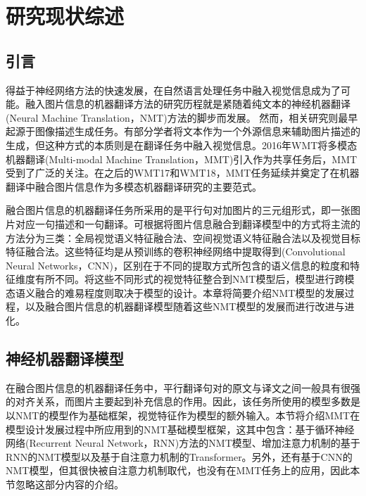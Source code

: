 \chapter{研究现状综述}\label{chap:relatedwork}

\section{引言}
得益于神经网络方法的快速发展，在自然语言处理任务中融入视觉信息成为了可能。融入图片信息的机器翻译方法的研究历程就是紧随着纯文本的神经机器翻译(Neural Machine Translation，NMT)方法的脚步而发展。
然而，相关研究则最早起源于图像描述生成任务。有部分学者将文本作为一个外源信息来辅助图片描述的生成，但这种方式的本质则是在翻译任务中融入视觉信息。2016年WMT将多模态机器翻译(Multi-modal Machine Translation，MMT)引入作为共享任务后，MMT受到了广泛的关注。在之后的WMT17和WMT18，MMT任务延续并奠定了在机器翻译中融合图片信息作为多模态机器翻译研究的主要范式。

融合图片信息的机器翻译任务所采用的是平行句对加图片的三元组形式，即一张图片对应一句描述和一句翻译。可根据将图片信息融合到翻译模型中的方式将主流的方法分为三类：全局视觉语义特征融合法、空间视觉语义特征融合法以及视觉目标特征融合法。这些特征均是从预训练的卷积神经网络中提取得到(Convolutional Neural Networks，CNN)，区别在于不同的提取方式所包含的语义信息的粒度和特征维度有所不同。将这些不同形式的视觉特征整合到NMT模型后，模型进行跨模态语义融合的难易程度则取决于模型的设计。本章将简要介绍NMT模型的发展过程，以及融合图片信息的机器翻译模型随着这些NMT模型的发展而进行改进与进化。

\section{神经机器翻译模型}
在融合图片信息的机器翻译任务中，平行翻译句对的原文与译文之间一般具有很强的对齐关系，而图片主要起到补充信息的作用。因此，该任务所使用的模型多数是以NMT的模型作为基础框架，视觉特征作为模型的额外输入。本节将介绍MMT在模型设计发展过程中所应用到的NMT基础模型框架，这其中包含：基于循环神经网络(Recurrent Neural Network，RNN)方法的NMT模型、增加注意力机制的基于RNN的NMT模型以及基于自注意力机制的Transformer。另外，还有基于CNN的NMT模型\cite{6_DBLP:journals/corr/GehringAGYD17}，但其很快被自注意力机制取代，也没有在MMT任务上的应用，因此本节忽略这部分内容的介绍。

